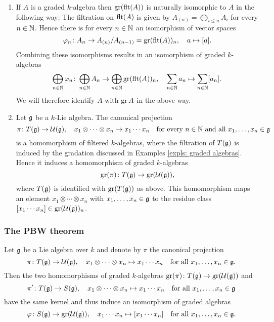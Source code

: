 \begin{expls}
 \begin{enumerate}[leftmargin=*]
  \item
   If $A$ is a graded $k$-algebra then $\operatorname{gr}(\operatorname{flt}(A))$ is naturally isomorphic to $A$ in the following way: The filtration on $\operatorname{flt}(A)$ is given by $A_{(n)} = \bigoplus_{i \leq n} A_i$ for every $n \in \mathbb{N}$. Hence there is for every $n \in \mathbb{N}$ an isomorphism of vector spaces
   \[
    \varphi_n \colon A_n \to A_{(n)}/A_{(n-1)} = \operatorname{gr}(\operatorname{flt}(A))_n, \quad a \mapsto [a].
   \]
   Combining these isomorphisms results in an isomorphism of graded $k$-algebras
   \[
    \bigoplus_{n \in \mathbb{N}} \varphi_n \colon
    \bigoplus_{n \in \mathbb{N}} A_n \to \bigoplus_{n \in \mathbb{N}} \operatorname{gr}(\operatorname{flt}(A))_n, \quad
    \sum_{n \in \mathbb{N}} a_n \mapsto \sum_{n \in \mathbb{N}} [a_n].
   \]
   We will therefore identify $A$ with $\operatorname{gr} A$ in the above way.
  \item
   Let $\mathfrak{g}$ be a $k$-Lie algebra. The canonical projection
   \[
    \pi \colon T(\mathfrak{g}) \to \mathcal{U}(\mathfrak{g}), \quad x_1 \otimes \dotsb \otimes x_n \to x_1 \dotsm x_n
    \quad \text{for every $n \in \mathbb{N}$ and all $x_1, \dotsc, x_n \in \mathfrak{g}$}
   \]
   is a homomorphism of filtered $k$-algebras, where the filtration of $T(\mathfrak{g})$ is induced by the gradation discussed in Examples \ref{expls: graded algebras}. Hence it induces a homomorphism of graded $k$-algebras
   \[
    \operatorname{gr}(\pi) \colon T(\mathfrak{g}) \to \operatorname{gr}(\mathcal{U}(\mathfrak{g})),
   \]
   where $T(\mathfrak{g})$ is identified with $\operatorname{gr}(T(\mathfrak{g}))$ as above. This homomorphism maps an element $x_1 \otimes \dotsb \otimes x_n$ with $x_1, \dots, x_n \in \mathfrak{g}$ to the residue class $[x_1 \dotsm x_n] \in \operatorname{gr}(\mathcal{U}(\mathfrak{g}))_n$.
 \end{enumerate}
\end{expls}



\subsubsection{The PBW theorem}


\begin{thrm} \label{thrm: pbw abstract}
 Let $\mathfrak{g}$ be a Lie algebra over $k$ and denote by $\pi$ the canonical projection
 \[
  \pi \colon T(\mathfrak{g}) \to \mathcal{U}(\mathfrak{g}), \quad
  x_1 \otimes \dotsb \otimes x_n \mapsto x_1 \dotsm x_n
  \quad \text{for all $x_1, \dotsc, x_n \in \mathfrak{g}$}.
 \]
 Then the two homomorphisms of graded $k$-algebras $\operatorname{gr}(\pi) \colon T(\mathfrak{g}) \to \operatorname{gr}(\mathcal{U}(\mathfrak{g}))$ and
 \[
  \pi' \colon T(\mathfrak{g}) \to S(\mathfrak{g}), \quad 
  x_1 \otimes \dotsb \otimes x_n \mapsto x_1 \dotsm x_n
  \quad \text{for all $x_1, \dotsc, x_n \in \mathfrak{g}$}
 \]
 have the same kernel and thus induce an isomorphism of graded algebras
 \begin{equation}\label{eqn: induced isomorphism of graded algebras}
  \varphi \colon S(\mathfrak{g}) \to \operatorname{gr}(\mathcal{U}(\mathfrak{g})), \quad
  x_1 \dotsm x_n \mapsto [x_1 \dotsm x_n]
  \quad \text{for all $x_1, \dotsc, x_n \in \mathfrak{g}$}.
 \end{equation}
\end{thrm}


